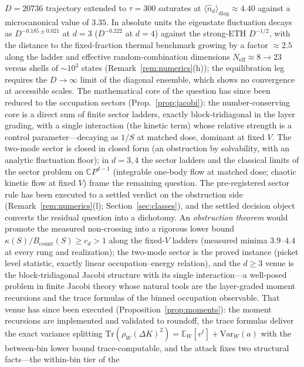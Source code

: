\documentclass[11pt,a4paper]{article}
\theoremstyle{plain}
\theoremstyle{definition}
\theoremstyle{remark}
\begin{document}
\begin{enumerate}[leftmargin=1.6em]
$D=20736$ trajectory extended to $\tau=300$ saturates at $\langle\hat
n_{d}\rangle_{\mathrm{diag}}\approx4.40$ against a microcanonical value of $3.35$. In
absolute units the eigenstate fluctuation decays as $D^{-0.185\pm0.021}$ at $d=3$
($D^{-0.222}$ at $d=4$) against the strong-ETH $D^{-1/2}$, with the distance to the
fixed-fraction thermal benchmark growing by a factor $\approx2.5$ along the ladder and
effective random-combination dimensions $N_{\mathrm{eff}}\approx8\to23$ versus shells of
$\sim10^{3}$ states (Remark~\ref{rem:numerics}(h)); the equilibration leg requires the
$D\to\infty$ limit of the diagonal ensemble, which shows no convergence at accessible
scales. The mathematical core of the question has since been reduced to the occupation
sectors (Prop.~\ref{prop:jacobi}): the number-conserving core is a direct sum of
finite sector ladders, exactly block-tridiagonal in the layer grading, with a single
interaction (the kinetic term) whose relative strength is a control parameter---decaying
as $1/S$ at matched dose, dominant at fixed $V$. The two-mode sector is closed in closed
form (an obstruction by solvability, with an analytic fluctuation floor); in $d=3,4$ the
sector ladders and the classical limits of the sector problem on
$\mathbb{C}P^{d-1}$ (integrable one-body flow at matched dose; chaotic kinetic flow at
fixed $V$) frame the remaining question. The pre-registered sector rule has been
executed to a settled verdict on the obstruction side
(Remark~\ref{rem:numerics}(l); Section~\ref{sec:classes}), and the settled decision
object converts the residual question into a dichotomy. An \emph{obstruction theorem}
would promote the measured non-crossing into a rigorous lower bound
$\kappa(S)/B_{\mathrm{count}}(S)\ge c_{d}>1$ along the fixed-$V$ ladders (measured
minima $3.9$--$4.4$ at every rung and realization); the two-mode sector is the proved
instance (picket level statistic, exactly linear occupation--energy relation), and the
$d\ge3$ venue is the block-tridiagonal Jacobi structure with its single
interaction---a well-posed problem in finite Jacobi theory whose natural tools are the
layer-graded moment recursions and the trace formulas of the binned occupation
observable. That venue has since been executed
(Proposition~\ref{prop:moments}): the moment recursions are implemented and
validated to roundoff, the trace formulas deliver the exact variance
splitting
$\mathrm{Tr}(\rho_W(\Delta K)^{2})=\mathbb{E}_W[v^{\ell}]
+\mathrm{Var}_{W}(a)$ with the between-bin lower bound trace-computable,
and the attack fixes two structural facts---the within-bin tier of the

\end{enumerate}
\end{document}
